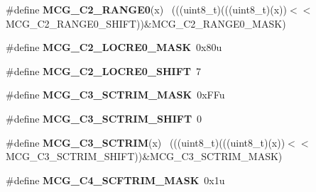 \begin{DoxyCompactItemize}
\item 
\hypertarget{group___m_c_g___register___masks_ga41d54c406df1619eeea11097d619c6a7}{}\#define {\bfseries M\+C\+G\+\_\+\+C2\+\_\+\+R\+A\+N\+G\+E0}(x)                                              ~(((uint8\+\_\+t)(((uint8\+\_\+t)(x))$<$$<$M\+C\+G\+\_\+\+C2\+\_\+\+R\+A\+N\+G\+E0\+\_\+\+S\+H\+I\+F\+T))\&M\+C\+G\+\_\+\+C2\+\_\+\+R\+A\+N\+G\+E0\+\_\+\+M\+A\+S\+K)\label{group___m_c_g___register___masks_ga41d54c406df1619eeea11097d619c6a7}

\item 
\hypertarget{group___m_c_g___register___masks_gae89f2e48b02a39563115d1a60dc8f16f}{}\#define {\bfseries M\+C\+G\+\_\+\+C2\+\_\+\+L\+O\+C\+R\+E0\+\_\+\+M\+A\+S\+K}~0x80u\label{group___m_c_g___register___masks_gae89f2e48b02a39563115d1a60dc8f16f}

\item 
\hypertarget{group___m_c_g___register___masks_gabc900505d9a12bd7a33c2a5e3cfdf02a}{}\#define {\bfseries M\+C\+G\+\_\+\+C2\+\_\+\+L\+O\+C\+R\+E0\+\_\+\+S\+H\+I\+F\+T}~7\label{group___m_c_g___register___masks_gabc900505d9a12bd7a33c2a5e3cfdf02a}

\item 
\hypertarget{group___m_c_g___register___masks_ga44433c6372539508fbf3090b591f3d89}{}\#define {\bfseries M\+C\+G\+\_\+\+C3\+\_\+\+S\+C\+T\+R\+I\+M\+\_\+\+M\+A\+S\+K}~0x\+F\+Fu\label{group___m_c_g___register___masks_ga44433c6372539508fbf3090b591f3d89}

\item 
\hypertarget{group___m_c_g___register___masks_ga8b5c3c55be188745fefec24b945110b7}{}\#define {\bfseries M\+C\+G\+\_\+\+C3\+\_\+\+S\+C\+T\+R\+I\+M\+\_\+\+S\+H\+I\+F\+T}~0\label{group___m_c_g___register___masks_ga8b5c3c55be188745fefec24b945110b7}

\item 
\hypertarget{group___m_c_g___register___masks_ga6b77fdc5ccef1d81f2f78baa917b117c}{}\#define {\bfseries M\+C\+G\+\_\+\+C3\+\_\+\+S\+C\+T\+R\+I\+M}(x)                                              ~(((uint8\+\_\+t)(((uint8\+\_\+t)(x))$<$$<$M\+C\+G\+\_\+\+C3\+\_\+\+S\+C\+T\+R\+I\+M\+\_\+\+S\+H\+I\+F\+T))\&M\+C\+G\+\_\+\+C3\+\_\+\+S\+C\+T\+R\+I\+M\+\_\+\+M\+A\+S\+K)\label{group___m_c_g___register___masks_ga6b77fdc5ccef1d81f2f78baa917b117c}

\item 
\hypertarget{group___m_c_g___register___masks_ga7386e83fdee774ec5d6ec402bae1e432}{}\#define {\bfseries M\+C\+G\+\_\+\+C4\+\_\+\+S\+C\+F\+T\+R\+I\+M\+\_\+\+M\+A\+S\+K}~0x1u\label{group___m_c_g___register___masks_ga7386e83fdee774ec5d6ec402bae1e432}


\end{DoxyCompactItemize}
